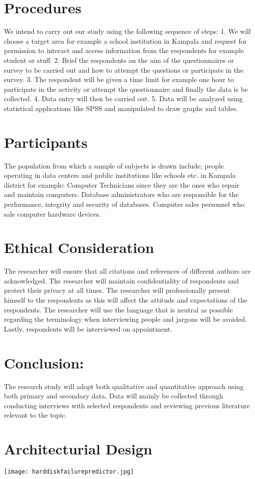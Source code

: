 \documentclass{article}
\begin{document}
	
\section{Procedures} 
We intend to carry out our study using the following sequence of steps: 
1. We will choose a target area for example a school institution in Kampala and request for permission to interact and access information from the respondents for example student or stuff. 
2. Brief the respondents on the aim of the questionnaires or survey to be carried out and how to attempt the questions or participate in the survey. 
3. The respondent will be given a time limit for example one hour to participate in the activity or attempt the questionnaire and finally the data is be collected. 
4. Data entry will then be carried out. 
5. Data will be analyzed using statistical applications like SPSS and manipulated to draw graphs and tables. 

\section{Participants} 
The population from which a sample of subjects is drawn include; people operating in data centers and public institutions like schools etc. in Kampala district for example: 
Computer Technicians since they are the ones who repair and maintain computers.
Database administrators who are responsible for the performance, integrity and security of databases. 
Computer sales personnel who sale computer hardware devices. 
\section{Ethical Consideration} 
The researcher will ensure that all citations and references of different authors are acknowledged. The researcher will maintain confidentiality of respondents and protect their privacy at all times. The researcher will professionally present himself to the respondents as this will affect the attitude and expectations of the respondents. The researcher will use the language that is neutral as possible regarding the terminology when interviewing people and jargons will be avoided. Lastly, respondents will be interviewed on appointment. 
\section{Conclusion:} 
The research study will adopt both qualitative and quantitative approach using both primary and secondary data. Data will mainly be collected through conducting interviews with selected respondents and reviewing previous literature relevant to the topic.
\section{Architecturial Design}
\texttt{[image: harddiskfailurepredictor.jpg]}
\end{document}

